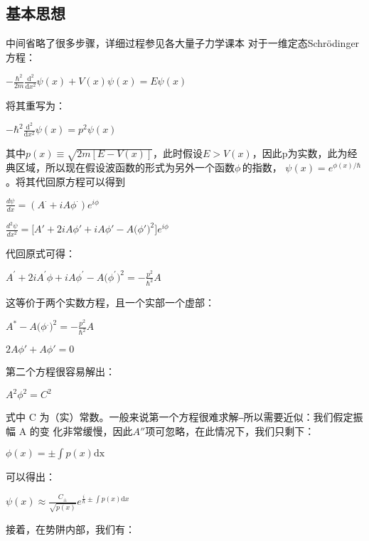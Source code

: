 \documentclass[12pt, a4paper, oneside]{ctexart}
\begin{document}
\begin{spacing}{2.0}
\subsection{基本思想}
中间省略了很多步骤，详细过程参见各大量子力学课本
对于一维定态Schrödinger方程：
\begin{center}
    $\displaystyle - \frac{\hbar^2}{2m} \frac{\mathrm{d}^2}{\mathrm{d}x^2} \psi(x) + V(x) \psi(x) = E \psi(x)\,\!$
\end{center}
将其重写为：
\begin{center}
    $\displaystyle -\hbar^2\frac{\mathrm{d}^2}{\mathrm{d}x^2} \psi(x) =p^2\psi(x)\,\!$
\end{center}
其中$p(x)\equiv \sqrt{2m[E-V(x)]}$，此时假设$E>V(x)$，因此p为实数，此为经典区域，所以现在假设波函数的形式为另外一个函数$\phi\,\!$的指数，
$\displaystyle \psi(x) = e^{\phi(x)/\hbar} \,\!$。将其代回原方程可以得到
\begin{center}
    $\displaystyle\frac{d\psi}{dx}=\left(A^\cdot+i A\phi^\cdot\right)e^{i\phi}$
\end{center}
\begin{center}
    $\displaystyle\frac{d^2\psi}{dx^2}=\bigg[A'+2i A\phi'+i A\phi'-A\Big(\phi'\Big)^2\bigg]e^{i\phi}$
\end{center}
代回原式可得：
\begin{center}
    $\displaystyle A^{'}+2i A^{'}\phi+i A\phi^{'}-A\Big(\phi^{'}\Big)^{2}=-\frac{p^{2}}{\hbar^{2}}A$
\end{center}
这等价于两个实数方程，且一个实部一个虚部：
\begin{center}
    $\displaystyle A^*-A\Big(\phi^.\Big)^2=-\frac{p^2}{\hbar^2}A$
\end{center}
\begin{center}
    $2A\phi'+A\phi'=0$
\end{center}
第二个方程很容易解出：
\begin{center}
    $A^2\phi^2=C^2$
\end{center}
式中 C 为（实）常数。一般来说第一个方程很难求解⎯所以需要近似：我们假定振幅 A 的变
化非常缓慢，因此$A''$项可忽略，在此情况下，我们只剩下：
\begin{center}
    $\displaystyle\phi(x) = \pm \int p(x) \mathrm{dx}$
\end{center}
可以得出：
\begin{center}
    $\displaystyle\psi(x) \approx  \frac{C_{\pm}} {\sqrt{p(x)}}  e^{\frac{i}{\hbar}\pm\int p(x) \mathrm{d}x}$
\end{center}
接着，在势阱内部，我们有：
\begin{center}

\end{center}
\end{spacing}
\end{document}
